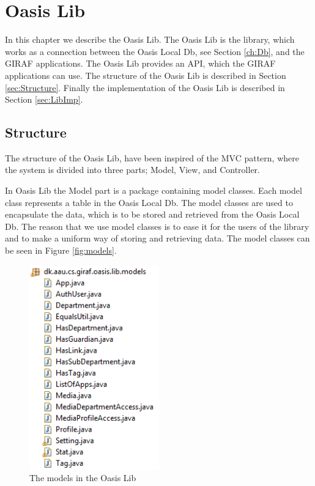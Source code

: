 \chapter{Oasis Lib}
\label{ch:Lib}
In this chapter we describe the Oasis Lib.
The Oasis Lib is the library, which works as a connection between the Oasis Local Db, see Section \vref{ch:Db}, and the GIRAF applications.
The Oasis Lib provides an API, which the GIRAF applications can use.
The structure of the Oasis Lib is described in Section \vref{sec:Structure}.
Finally the implementation of the Oasis Lib is described in Section \vref{sec:LibImp}.

\section{Structure}
\label{sec:Structure}
The structure of the Oasis Lib, have been inspired of the MVC pattern, where the system is divided into three parts; Model, View, and Controller. 

In Oasis Lib the Model part is a package containing model classes. Each model class represents a table in the Oasis Local Db.
The model classes are used to encapsulate the data, which is to be stored and retrieved from the Oasis Local Db.
The reason that we use model classes is to ease it for the users of the library and to make a uniform way of storing and retrieving data.
The model classes can be seen in Figure \vref{fig:models}.
\begin{figure}[H]
	\centering
		\includegraphics[width=0.5\textwidth]{images/models.png}
	\caption{The models in the Oasis Lib}
	\label{fig:models}
\end{figure}

